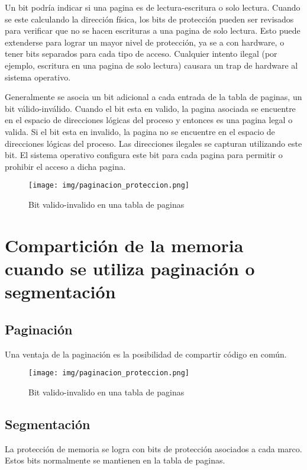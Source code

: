 \documentclass{article}
\begin{document}
Un bit podría indicar si una pagina es de lectura-escritura o solo lectura. Cuando se este calculando la dirección física, los bits de protección pueden ser revisados para verificar que no se hacen escrituras a una pagina de solo lectura. Esto puede extenderse para lograr un mayor nivel de protección, ya se a con hardware, o tener bits separados para cada tipo de acceso. Cualquier intento ilegal (por ejemplo, escritura en una pagina de solo lectura) causara un trap de hardware al sistema operativo.

Generalmente se asocia un bit adicional a cada entrada de la tabla de paginas, un bit válido-inválido. Cuando el bit esta en valido, la pagina asociada se encuentre en el espacio de direcciones lógicas del proceso y entonces es una pagina legal o valida. Si el bit esta en invalido, la pagina no se encuentre en el espacio de direcciones lógicas del proceso. Las direcciones ilegales se capturan utilizando este bit. El sistema operativo configura este bit para cada pagina para permitir o prohibir el acceso a dicha pagina.

\begin{figure}[H]
	\centering
	\texttt{[image: img/paginacion\_proteccion.png]}
	\caption{Bit valido-invalido en una tabla de paginas}
\end{figure}


{\centering \section*{Compartición de la memoria cuando se utiliza paginación o segmentación}}

\subsection*{Paginación}
Una ventaja de la paginación es la posibilidad de compartir código en común. 

\begin{figure}[H]
	\centering
	\texttt{[image: img/paginacion\_proteccion.png]}
	\caption{Bit valido-invalido en una tabla de paginas}
\end{figure}

\subsection*{Segmentación}
La protección de memoria se logra con bits de protección asociados a cada marco. Estos bits normalmente se mantienen en la tabla de paginas.
\end{document}
